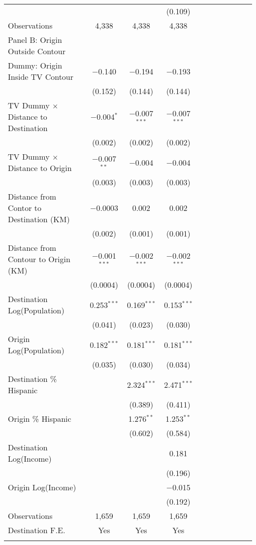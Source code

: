 \begin{table}[!h]
{\begin{threeparttable}
\begin{tabular}{lcccccccccc}
  &  &  & (0.109) \\ 
Observations & 4,338 & 4,338 & 4,338 \\ 
\hline\addlinespace
Panel B: Origin Outside Contour & & & \\ 
\hline\addlinespace
 Dummy: Origin Inside TV Contour & $-$0.140 & $-$0.194 & $-$0.193 \\ 
  & (0.152) & (0.144) & (0.144) \\ 
 TV Dummy $\times$ Distance to Destination & $-$0.004$^{*}$ & $-$0.007$^{***}$ & $-$0.007$^{***}$ \\ 
  & (0.002) & (0.002) & (0.002) \\ 
 TV Dummy $\times$ Distance to Origin & $-$0.007$^{**}$ & $-$0.004 & $-$0.004 \\ 
  & (0.003) & (0.003) & (0.003) \\ 
 Distance from Contor to Destination (KM) & $-$0.0003 & 0.002 & 0.002 \\ 
  & (0.002) & (0.001) & (0.001) \\ 
 Distance from Contour to Origin (KM) & $-$0.001$^{***}$ & $-$0.002$^{***}$ & $-$0.002$^{***}$ \\ 
  & (0.0004) & (0.0004) & (0.0004) \\ 
 Destination Log(Population) & 0.253$^{***}$ & 0.169$^{***}$ & 0.153$^{***}$ \\ 
  & (0.041) & (0.023) & (0.030) \\ 
 Origin Log(Population) & 0.182$^{***}$ & 0.181$^{***}$ & 0.181$^{***}$ \\ 
  & (0.035) & (0.030) & (0.034) \\ 
 Destination \% Hispanic &  & 2.324$^{***}$ & 2.471$^{***}$ \\ 
  &  & (0.389) & (0.411) \\ 
 Origin \% Hispanic &  & 1.276$^{**}$ & 1.253$^{**}$ \\ 
  &  & (0.602) & (0.584) \\ 
 Destination Log(Income) &  &  & 0.181 \\ 
  &  &  & (0.196) \\ 
 Origin Log(Income) &  &  & $-$0.015 \\ 
  &  &  & (0.192) \\ 
Observations & 1,659 & 1,659 & 1,659 \\        
\hline\addlinespace
                                Destination F.E. & Yes & Yes  & Yes\\
				\addlinespace\hline\hline
			\end{tabular}
			\begin{tablenotes}[flushleft]

\end{tablenotes}
\end{threeparttable}}
\end{table}
